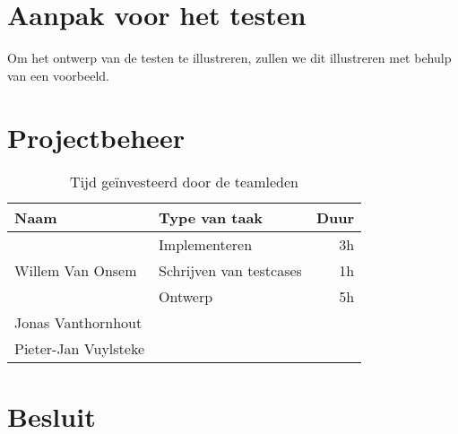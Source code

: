 \documentclass[a4paper, titlepage,12pt]{article}
\begin{document}
\section{Aanpak voor het testen}
\label{testen}
Om het ontwerp van de testen te illustreren, zullen we dit illustreren met behulp van een voorbeeld.

\newpage
\section{Projectbeheer}
\label{projectbeheer}
\begin{table}[H]
\centering
\begin{tabular}{|llr|}
\hline
Naam&Type van taak&Duur\\
\hline
\hline
\multirow{3}{*}{Willem Van Onsem}&Implementeren&3h\\
&Schrijven van testcases&1h\\
&Ontwerp&5h\\
\hline
Jonas Vanthornhout&&\\
\hline
Pieter-Jan Vuylsteke&&\\
\hline
\end{tabular}
\caption{Tijd ge\"investeerd door de teamleden}
\label{tbl:timeUsage}
\end{table}
\newpage
\section{Besluit}
\label{besluit}
\newpage
\nocite{*}


\end{document}
